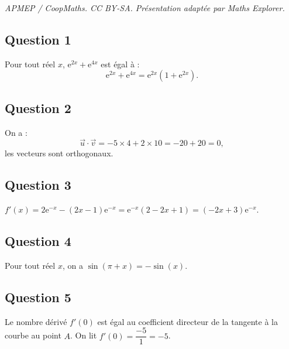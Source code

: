 \documentclass[10pt]{article}
\providecommand{\e}{{\mathrm{e}}}
\begin{document}
\noindent\textit{APMEP / CoopMaths. CC BY-SA. Présentation adaptée par Maths Explorer.}\par\medskip
\subsection*{Question 1}

Pour tout réel \(x\), \( \e^{2x} + \e^{4x} \) est égal à :
\[
\e^{2x} + \e^{4x} = \e^{2x}(1 + \e^{2x}).
\]

\subsection*{Question 2}

On a :
\[
\vec{u} \cdot \vec{v} = -5 \times 4 + 2 \times 10 = -20 + 20 = 0,
\]
les vecteurs sont orthogonaux.

\subsection*{Question 3}

\(f'(x) = 2\e^{-x} - (2x - 1)\e^{-x} = \e^{-x} (2 - 2x + 1) = (-2x + 3)\e^{-x}\).

\subsection*{Question 4}

Pour tout réel \(x\), on a \(\sin(\pi + x) = -\sin(x)\).

\subsection*{Question 5}

Le nombre dérivé \(f'(0)\) est égal au coefficient directeur de la tangente à la courbe au point \(A\). On lit \(f'(0) = \dfrac{-5}{1}= -5\).
\end{document}
